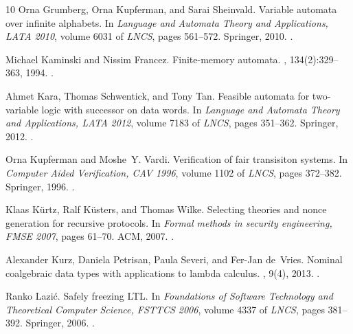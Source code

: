 \documentclass[10pt,a4paper]{amsart}
\numberwithin{equation}{section}
\newcommand{\+}[1]{\mathcal{#1}\xspace}
\theoremstyle{definition}
\begin{document}
\begin{thebibliography}{10}
Orna Grumberg, Orna Kupferman, and Sarai Sheinvald.
\newblock Variable automata over infinite alphabets.
\newblock In {\em Language and Automata Theory and Applications, {LATA} 2010},
  volume 6031 of {\em LNCS}, pages 561--572. Springer, 2010.
\newblock \href {http://dx.doi.org/10.1007/978-3-642-13089-2}
  {}.

Michael Kaminski and Nissim Francez.
\newblock Finite-memory automata.
, 134(2):329--363, 1994.
\newblock \href {http://dx.doi.org/10.1016/0304-3975(94)90242-9}
  {}.

Ahmet Kara, Thomas Schwentick, and Tony Tan.
\newblock Feasible automata for two-variable logic with successor on data
  words.
\newblock In {\em Language and Automata Theory and Applications, {LATA} 2012},
  volume 7183 of {\em LNCS}, pages 351--362. Springer, 2012.
\newblock \href {http://dx.doi.org/10.1007/978-3-642-28332-1_30}
  {}.

Orna Kupferman and Moshe~Y. Vardi.
\newblock Verification of fair transisiton systems.
\newblock In {\em Computer Aided Verification, {CAV} 1996}, volume 1102 of {\em
  LNCS}, pages 372--382. Springer, 1996.
\newblock \href {http://dx.doi.org/10.1007/3-540-61474-5_84}
  {}.

Klaas K{\"{u}}rtz, Ralf K{\"{u}}sters, and Thomas Wilke.
\newblock Selecting theories and nonce generation for recursive protocols.
\newblock In {\em Formal methods in security engineering, {FMSE} 2007}, pages
  61--70. {ACM}, 2007.
\newblock \href {http://dx.doi.org/10.1145/1314436.1314445}
  {}.

Alexander Kurz, Daniela Petrisan, Paula Severi, and Fer{-}Jan de~Vries.
\newblock Nominal coalgebraic data types with applications to lambda calculus.
, 9(4), 2013.
\newblock \href {http://dx.doi.org/10.2168/LMCS-9(4:20)2013}
  {}.

Ranko Lazi{\'c}.
\newblock Safely freezing {LTL}.
\newblock In {\em Foundations of Software Technology and Theoretical Computer
  Science, {FSTTCS} 2006}, volume 4337 of {\em LNCS}, pages 381--392. Springer,
  2006.
\newblock \href {http://dx.doi.org/10.1007/11944836_35}
  {}.


\end{thebibliography}
\end{document}
